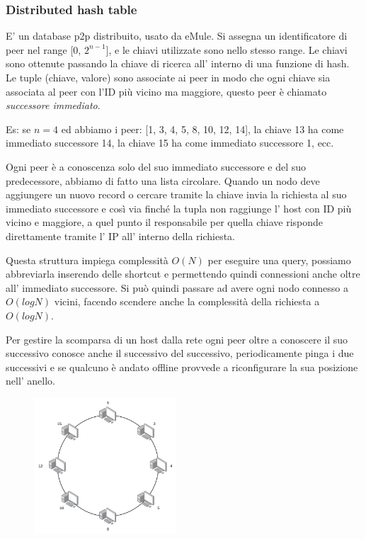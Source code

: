 \subsubsection{Distributed hash table}
E' un database p2p distribuito, usato da eMule.
Si assegna un identificatore di peer nel range [0, $2^{n-1}$], e le chiavi utilizzate sono nello stesso range.
Le chiavi sono ottenute passando la chiave di ricerca all' interno di una funzione di hash.
Le tuple (chiave, valore) sono associate ai peer in modo che ogni chiave sia associata al peer con l'ID più vicino ma maggiore, questo peer è chiamato \emph{successore immediato}.

Es: se $n = 4$ ed abbiamo i peer: [1, 3, 4, 5, 8, 10, 12, 14], la chiave 13 ha come immediato successore 14, la chiave 15 ha come immediato successore 1, ecc.

Ogni peer è a conoscenza solo del suo immediato successore e del suo predecessore, abbiamo di fatto una lista circolare.
Quando un nodo deve aggiungere un nuovo record o cercare tramite la chiave invia la richiesta al suo immediato successore e così via finché la tupla non raggiunge l' host con ID più vicino e maggiore, a quel punto il responsabile per quella chiave risponde direttamente tramite l' IP all' interno della richiesta.

Questa struttura impiega complessità $O(N)$ per eseguire una query, possiamo abbreviarla inserendo delle shortcut e permettendo quindi connessioni anche oltre all' immediato successore.
Si può quindi passare ad avere ogni nodo connesso a $O(logN)$ vicini, facendo scendere anche la complessità della richiesta a $O(logN)$.

Per gestire la scomparsa di un host dalla rete ogni peer oltre a conoscere il suo successivo conosce anche il successivo del successivo, periodicamente pinga i due successivi e se qualcuno è andato offline provvede a riconfigurare la sua posizione nell' anello.

\begin{figure}[H]
    \centering
    \includegraphics[width=200px]{images/2_Applicazioni_di_rete/DHT.png}
\end{figure}

